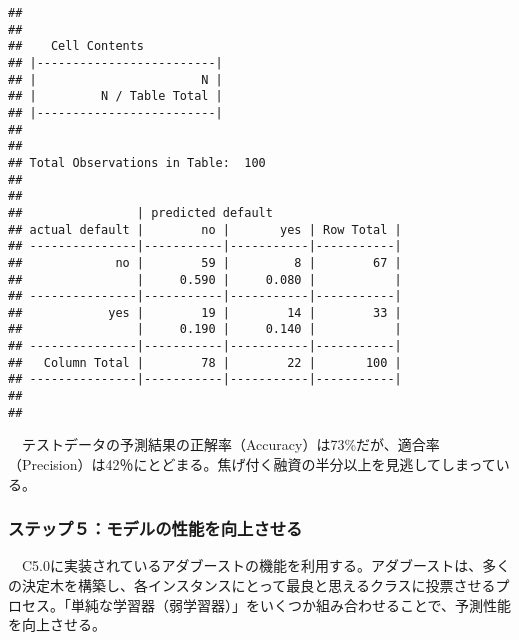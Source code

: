 \documentclass[
]{article}
\newenvironment{Shaded}{\begin{snugshade}}{\end{snugshade}}
\newcommand{\AttributeTok}[1]{\textcolor[rgb]{0.13,0.29,0.53}{#1}}
\newcommand{\ConstantTok}[1]{\textcolor[rgb]{0.56,0.35,0.01}{#1}}
\newcommand{\FunctionTok}[1]{\textcolor[rgb]{0.13,0.29,0.53}{\textbf{#1}}}
\newcommand{\NormalTok}[1]{#1}
\newcommand{\OtherTok}[1]{\textcolor[rgb]{0.56,0.35,0.01}{#1}}
\newcommand{\SpecialCharTok}[1]{\textcolor[rgb]{0.81,0.36,0.00}{\textbf{#1}}}
\newcommand{\StringTok}[1]{\textcolor[rgb]{0.31,0.60,0.02}{#1}}
\begin{document}
\begin{Shaded}
\end{Shaded}

\begin{verbatim}
## 
##  
##    Cell Contents
## |-------------------------|
## |                       N |
## |         N / Table Total |
## |-------------------------|
## 
##  
## Total Observations in Table:  100 
## 
##  
##                | predicted default 
## actual default |        no |       yes | Row Total | 
## ---------------|-----------|-----------|-----------|
##             no |        59 |         8 |        67 | 
##                |     0.590 |     0.080 |           | 
## ---------------|-----------|-----------|-----------|
##            yes |        19 |        14 |        33 | 
##                |     0.190 |     0.140 |           | 
## ---------------|-----------|-----------|-----------|
##   Column Total |        78 |        22 |       100 | 
## ---------------|-----------|-----------|-----------|
## 
## 
\end{verbatim}

　テストデータの予測結果の正解率（Accuracy）は73\%だが、適合率（Precision）は42％にとどまる。焦げ付く融資の半分以上を見逃してしまっている。

\subsubsection{ステップ５：モデルの性能を向上させる}\label{ux30b9ux30c6ux30c3ux30d7uxff15ux30e2ux30c7ux30ebux306eux6027ux80fdux3092ux5411ux4e0aux3055ux305bux308b}

　C5.0に実装されているアダブーストの機能を利用する。アダブーストは、多くの決定木を構築し、各インスタンスにとって最良と思えるクラスに投票させるプロセス。「単純な学習器（弱学習器）」をいくつか組み合わせることで、予測性能を向上させる。
\end{document}
